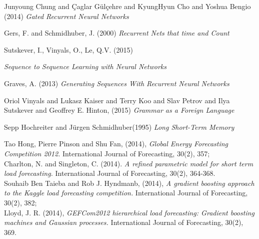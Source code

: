 \documentclass{article} %
\begin{document}
\begin{thebibliography}{9}


\small{




Junyoung Chung and
               {\c{C}}aglar G{\"{u}}l{\c{c}}ehre and
               KyungHyun Cho and
               Yoshua Bengio (2014)
{\it Gated Recurrent Neural Networks}


Gers, F. and Schmidhuber, J. (2000)
{\it  Recurrent Nets that time and Count} 


Sutskever, I., Vinyals, O., Le, Q.V. (2015)

{\it Sequence to Sequence Learning with Neural Networks}


Graves, A. (2013)
{\it Generating Sequences With Recurrent Neural Networks}

Oriol Vinyals and
               Lukasz Kaiser and
               Terry Koo and
               Slav Petrov and
               Ilya Sutskever and
               Geoffrey E. Hinton, (2015)
{\it Grammar as a Foreign Language}

Sepp Hochreiter and Jürgen Schmidhuber(1995)
{\it Long Short-Term Memory}

Tao Hong, Pierre Pinson and Shu Fan, 
(2014), {\it Global Energy Forecasting Competition 2012.}
International Journal of Forecasting, 30(2), 357;
\\
Charlton, N. and Singleton, C. 
(2014). 
{\it A refined parametric model for short term load forecasting.}
International Journal of Forecasting,
30(2), 364-368.
\\
Souhaib Ben Taieba and Rob J. Hyndmanb,
(2014), 
{\it A gradient boosting approach to the Kaggle load forecasting 
competition.}
International Journal of Forecasting, 30(2), 382;
\\
Lloyd, J. R. (2014), 
{\it GEFCom2012 hierarchical load forecasting: Gradient boosting machines and Gaussian processes. }
International Journal of Forecasting, 30(2), 369.


}

\end{thebibliography}
\end{document}

